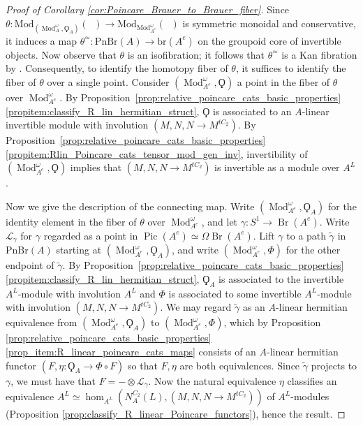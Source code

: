 \documentclass{article}
\DeclareMathOperator{\Br}{Br} %
\DeclareMathOperator{\Cat}{\mathcal{C}at} %
\DeclareMathOperator{\Catex}{\Cat_\infty^{ex}} %
\DeclareMathOperator{\Catpidem}{Cat^p_{\infty, idem}} %
\DeclareMathOperator{\Mod}{Mod} %
\DeclareMathOperator{\Pic}{Pic} %
\newcommand{\pnbr}{\ensuremath{\mathrm{PnBr}}}
\theoremstyle{definition}
\begin{document}
\begin{proof}[Proof of Corollary \ref{cor:Poincare_Brauer_to_Brauer_fiber}]
Since $\theta:\mathrm{Mod}_{(\Mod_A^\omega, \Qoppa_A)}(\Catpidem)\to \mathrm{Mod}_{\mathrm{Mod}_{A^e}^\omega}(\Catex)$ is symmetric monoidal and conservative, it induces a map $ \theta^\simeq \colon \pnbr(A) \to \mathrm{br}(A^e) $ on the groupoid core of invertible objects. 
Now observe that $ \theta $ is an isofibration; it follows that $ \theta^\simeq $ is a Kan fibration by \cite[\href{https://kerodon.net/tag/01EZ}{Proposition 01EZ}]{kerodon}. 
Consequently, to identify the homotopy fiber of $ \theta $, it suffices to identify the fiber of $ \theta $ over a single point. 
Consider $ \left(\Mod_{A^e}^\omega, \Qoppa\right) $ a point in the fiber of $ \theta $ over $ \Mod_{A^e}^\omega $. 
By Proposition~\ref{prop:relative_poincare_cats_basic_properties}\ref{propitem:classify_R_lin_hermitian_struct}, $ \Qoppa $ is associated to an $ A $-linear invertible module with involution $ \left(M, N, N \to M^{tC_2} \right) $. 
By Proposition~\ref{prop:relative_poincare_cats_basic_properties}\ref{propitem:Rlin_Poincare_cats_tensor_mod_gen_inv}, invertibility of $ \left(\Mod_{A^e}^\omega, \Qoppa\right) $ implies that $ \left(M, N, N \to M^{tC_2}\right) $ is invertible as a module over $ A^L $. 

Now we give the description of the connecting map. 
Write $ \left(\Mod_{A^e}^\omega, \Qoppa_A\right) $ for the identity element in the fiber of $ \theta $ over $ \Mod_{A^e}^\omega $, and let $ \gamma \colon S^1 \to \Br(A^e) $. 
Write $ \mathcal{L}_\gamma $ for $ \gamma $ regarded as a point in $ \Pic(A^e) \simeq \Omega \Br(A^e) $. 
Lift $ \gamma $ to a path $ \widetilde{\gamma} $ in $ \pnbr(A) $ starting at $ \left(\Mod_{A^e}^\omega, \Qoppa_A\right) $, and write $ \left(\Mod_{A^e}^\omega, \Phi\right) $ for the other endpoint of $ \widetilde{\gamma} $. 
By Proposition~\ref{prop:relative_poincare_cats_basic_properties}\ref{propitem:classify_R_lin_hermitian_struct}, $ \Qoppa_A $ is associated to the invertible $ A^L $-module with involution $ A^L $ and $ \Phi $ is associated to some invertible $ A^L $-module with involution $ (M, N, N \to M^{tC_2}) $. 
We may regard $ \widetilde{\gamma} $ as an $ A $-linear hermitian equivalence from $ \left(\Mod_{A^e}^\omega, \Qoppa_A\right) $ to $ \left(\Mod_{A^e}^\omega, \Phi\right) $, which by Proposition \ref{prop:relative_poincare_cats_basic_properties}\ref{prop_item:R_linear_poincare_cats_maps} consists of an $ A $-linear hermitian functor $ (F,\eta \colon \Qoppa_A \to \Phi \circ F) $ so that $ F, \eta $ are both equivalences. 
Since $ \widetilde{\gamma} $ projects to $ \gamma $, we must have that $ F = - \otimes \mathcal{L}_\gamma $. 
Now the natural equivalence $ \eta $ classifies an equivalence $ A^L \simeq \hom_{A^L}(N^{C_2}_A(L), (M,N, N \to M^{tC_2})) $ of $ A^L $-modules (Proposition \ref{prop:classify_R_linear_Poincare_functors}), hence the result. 
\end{proof}
\end{document}
